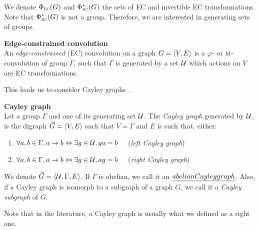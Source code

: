 We denote $\Phi_{\operatorname{\textsc{ec}}}(G)$ and $\Phi^*_{\operatorname{\textsc{ec}}}(G)$ the sets of EC and invertible EC transformations. Note that $\Phi^*_{\operatorname{\textsc{ec}}}(G)$ is not a group. Therefore, we are interested in generating sets of groups.

\begin{definition}\textbf{Edge-constrained convolution}\\
An \emph{edge-constrained} (EC) convolution on a graph $G = \langle V, E \rangle$ is a $\varphi$- or $\operatorname{\textsc{m}}$-convolution of group $\Gamma$, such that $\Gamma$ is generated by a set $\mathcal{U}$ which actions on $V$ are EC transformations.
\end{definition}

This leads us to consider Cayley graphs~\citep{cayley1878desiderata}.%

\begin{definition}\textbf{Cayley graph}\\
Let a group $\Gamma$ and one of its generating set $\mathcal{U}$. The \emph{Cayley graph} generated by $\mathcal{U}$, is the digraph $\vec{G} = \langle V, E \rangle$ such that $V = \Gamma$ and $E$ is such that, either:
\begin{enumerate}[nolistsep,noitemsep,label=(\roman*)]
\item $\forall a,b \in \Gamma, a \rightarrow b \Leftrightarrow \exists g \in \mathcal{U}, ga = b \quad$ (\emph{left Cayley graph})
\item $\forall a,b \in \Gamma, a \rightarrow b \Leftrightarrow \exists g \in \mathcal{U}, ag = b \quad$ (\emph{right Cayley graph})
\end{enumerate}
We denote $\vec{G} = \langle \mathcal{U}, \Gamma, E \rangle$. If $\Gamma$ is abelian, we call it an $\emph{abelian Cayley graph}$. Also, if a Cayley graph is isomorph to a subgraph of a graph $G$, we call it a \emph{Cayley subgraph} of $G$.

\end{definition}

\begin{remark}
Note that in the literature, a Cayley graph is usually what we defined as a right one. %
\end{remark}

